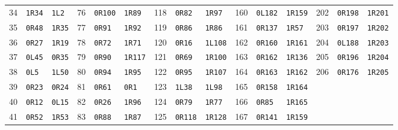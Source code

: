 \begin{center}
\begin{tabular}{rll@{\qquad}rll@{\qquad}rll@{\qquad}rll@{\qquad}rll}
34 & \texttt{1R34} & \texttt{1L2} & 76 & \texttt{0R100} & \texttt{1R89} & 118 & \texttt{0R82} & \texttt{1R97} & 160 & \texttt{0L182} & \texttt{1R159} & 202 & \texttt{0R198} & \texttt{1R201} \\
35 & \texttt{0R48} & \texttt{1R35} & 77 & \texttt{0R91} & \texttt{1R92} & 119 & \texttt{0R86} & \texttt{1R86} & 161 & \texttt{0R137} & \texttt{1R57} & 203 & \texttt{0R197} & \texttt{1R202} \\
36 & \texttt{0R27} & \texttt{1R19} & 78 & \texttt{0R72} & \texttt{1R71} & 120 & \texttt{0R16} & \texttt{1L108} & 162 & \texttt{0R160} & \texttt{1R161} & 204 & \texttt{0L188} & \texttt{1R203} \\
37 & \texttt{0L45} & \texttt{0R35} & 79 & \texttt{0R90} & \texttt{1R117} & 121 & \texttt{0R69} & \texttt{1R100} & 163 & \texttt{0R162} & \texttt{1R136} & 205 & \texttt{0R196} & \texttt{1R204} \\
38 & \texttt{0L5} & \texttt{1L50} & 80 & \texttt{0R94} & \texttt{1R95} & 122 & \texttt{0R95} & \texttt{1R107} & 164 & \texttt{0R163} & \texttt{1R162} & 206 & \texttt{0R176} & \texttt{1R205} \\
39 & \texttt{0R23} & \texttt{0R24} & 81 & \texttt{0R61} & \texttt{0R1} & 123 & \texttt{1L38} & \texttt{1L98} & 165 & \texttt{0R158} & \texttt{1R164} &  &  &  \\
40 & \texttt{0R12} & \texttt{0L15} & 82 & \texttt{0R26} & \texttt{1R96} & 124 & \texttt{0R79} & \texttt{1R77} & 166 & \texttt{0R85} & \texttt{1R165} &  &  &  \\
41 & \texttt{0R52} & \texttt{1R53} & 83 & \texttt{0R88} & \texttt{1R87} & 125 & \texttt{0R118} & \texttt{1R128} & 167 & \texttt{0R141} & \texttt{1R159} &  &  &  \\
\bottomrule
\end{tabular}
\end{center}

